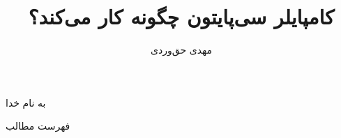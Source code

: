 \documentclass[aspectratio=169]{beamer}
\title{کامپایلر سی‌پایتون چگونه کار می‌کند؟}
\author{مهدی حق‌وردی}
\institute{
\\\texttt{[image: logos/logo]}\\
دانشگاه اصفهان
}
\date{}
\begin{document}
    
\begin{frame}[plain]
\begin{center}
به نام خدا
\end{center}
\maketitle
\end{frame}

\setcounter{framenumber}{0}
\raggedleft

\begin{frame}{فهرست مطالب}
\begin{flushleft}
\tableofcontents
\end{flushleft}
\end{frame}

\section{}
\section{}
\section{}
\section{}
\section{}
\section{}
\end{document}
